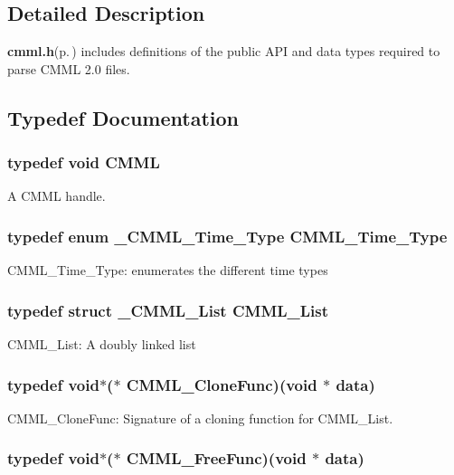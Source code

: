 \subsection{Detailed Description}
{\bf cmml.h}{\rm (p.\,\pageref{cmml_8h})} includes definitions of the public API and data types required to parse CMML 2.0 files.

\subsection{Typedef Documentation}
\subsubsection{\setlength{\rightskip}{0pt plus 5cm}typedef void {\bf CMML}}\label{cmml_8h_a0}


A CMML handle. 
\subsubsection{\setlength{\rightskip}{0pt plus 5cm}typedef enum {\bf \_\-CMML\_\-Time\_\-Type}  {\bf CMML\_\-Time\_\-Type}}\label{cmml_8h_a1}


CMML\_\-Time\_\-Type: enumerates the different time types 
\subsubsection{\setlength{\rightskip}{0pt plus 5cm}typedef struct {\bf \_\-CMML\_\-List} {\bf CMML\_\-List}}\label{cmml_8h_a2}


CMML\_\-List: A doubly linked list 
\subsubsection{\setlength{\rightskip}{0pt plus 5cm}typedef void$\ast$($\ast$ {\bf CMML\_\-Clone\-Func})(void $\ast$ data)}\label{cmml_8h_a3}


CMML\_\-Clone\-Func: Signature of a cloning function for CMML\_\-List. 
\subsubsection{\setlength{\rightskip}{0pt plus 5cm}typedef void$\ast$($\ast$ {\bf CMML\_\-Free\-Func})(void $\ast$ data)}\label{cmml_8h_a4}


